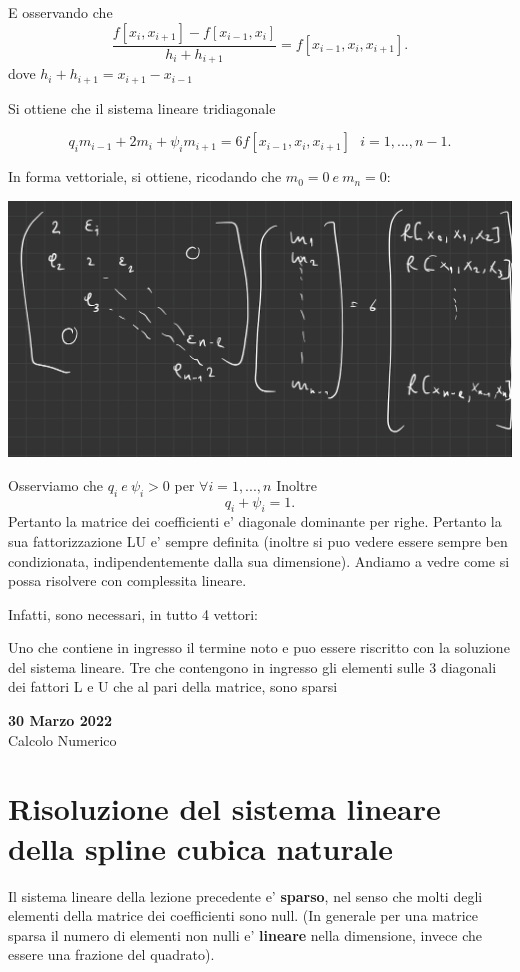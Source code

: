 \documentclass[11pt]{article}
\theoremstyle{definition}
\theoremstyle{plain}
\begin{document}
E osservando che 
\[
	\frac{f[x_{i},x_{i+1}]-f[x_{i-1},x_{i}]}{h_i+h_{i+1}}=f[x_{i-1},x_{i},x_{i+1}]
.\] 
dove $h_i+h_{i+1}=x_{i+1}-x_{i-1}$

Si ottiene che il sistema lineare tridiagonale

\[
	q_im_{i-1}+2m_i+\psi_im_{i+1}=6f[x_{i-1},x_{i},x_{i+1}]\ \ \ i=1,...,n-1
.\] 

In forma vettoriale, si ottiene, ricodando che $m_0=0\ e\ m_n=0$:

\includegraphics[width=\textwidth]{matrice_lu_spline_cubica}

Osserviamo che $q_i\ e\ \psi_i>0$ per $\forall i=1,...,n$
Inoltre
\[
q_i+\psi_i=1
.\] 
Pertanto la matrice dei coefficienti e' diagonale dominante per righe. Pertanto la sua fattorizzazione LU e' sempre definita (inoltre si puo vedere essere sempre ben condizionata, indipendentemente dalla sua dimensione). Andiamo a vedre come si possa risolvere con complessita lineare.

Infatti, sono necessari, in tutto 4 vettori:

Uno che contiene in ingresso il termine noto e puo essere riscritto con la soluzione del sistema lineare.
Tre che contengono in ingresso gli elementi sulle 3 diagonali dei fattori L e U che al pari della matrice, sono sparsi

\begin{center}
{\LARGE \bf 30 Marzo 2022}\\
{\large Calcolo Numerico}\\
\end{center}

\section{Risoluzione del sistema lineare della spline cubica naturale}
Il sistema lineare della lezione precedente e' \textbf{sparso}, nel senso che molti degli elementi della matrice dei coefficienti sono null. (In generale per una matrice sparsa il numero di elementi non nulli e' \textbf{lineare} nella dimensione, invece che essere una frazione del quadrato).
\end{document}
